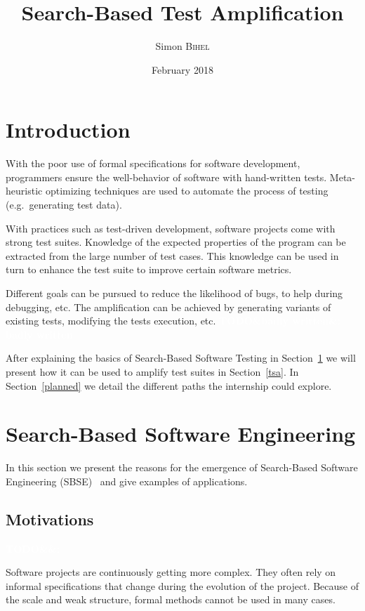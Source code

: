 \documentclass[11pt]{sdm}
\title{Search-Based Test Amplification}
\author{Simon \textsc{Bihel}}
\date{February 2018}
\newcommand{\todo}[1]{\colorbox{Red!75}{\textcolor{white}{\textbf{TODO\ifx&#1&\else: #1\fi}}}}
\begin{document}
\section*{Introduction}
\label{intro}

With the poor use of formal specifications for software development, programmers ensure the well-behavior of software with hand-written tests.
Meta-heuristic optimizing techniques are used to automate the process of testing (e.g.\ generating test data).

With practices such as test-driven development, software projects come with strong test suites.
Knowledge of the expected properties of the program can be extracted from the large number of test cases.
This knowledge can be used in turn to enhance the test suite to improve certain software metrics.

Different goals can be pursued to reduce the likelihood of bugs, to help during debugging, etc.
The amplification can be achieved by generating variants of existing tests, modifying the tests execution, etc.
\todo{badly written}

After explaining the basics of Search-Based Software Testing in Section~\ref{sbse} we will present how it can be used to amplify test suites in Section~\ref{tsa}.
In Section~\ref{planned} we detail the different paths the internship could explore.


\section{Search-Based Software Engineering}
\label{sbse}

In this section we present the reasons for the emergence of Search-Based Software Engineering (SBSE)~\cite{harman2001search,mcminn2011search} and give examples of applications.

\subsection{Motivations}
\label{motiv}
\todo{}

Software projects are continuously getting more complex.
They often rely on informal specifications that change during the evolution of the project.
Because of the scale and weak structure, formal methods cannot be used in many cases.
\end{document}
